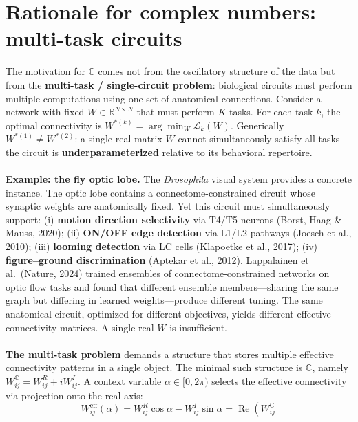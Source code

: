 \documentclass[11pt,a4paper]{article}
\newcommand{\R}{\mathbb{R}}
\newcommand{\C}{\mathbb{C}}
\newcommand{\re}{\operatorname{Re}}
\begin{document}
{%
\section{Rationale for complex numbers: multi-task circuits}
\label{sec:rationale}

The motivation for $\C$ comes not from the oscillatory structure of the data but from the \textbf{multi-task / single-circuit problem}: biological circuits must perform multiple computations using one set of anatomical connections. Consider a network with fixed $W \in \R^{N\times N}$ that must perform $K$ tasks. For each task $k$, the optimal connectivity is $W^{*(k)} = \arg\min_W \mathcal{L}_k(W)$. Generically $W^{*(1)} \neq W^{*(2)}$: a single real matrix $W$ cannot simultaneously satisfy all tasks---the circuit is \textbf{underparameterized} relative to its behavioral repertoire.
\\
\\
\textbf{Example: the fly optic lobe.} The \emph{Drosophila} visual system provides a concrete instance. The optic lobe contains a connectome-constrained circuit whose synaptic weights are anatomically fixed. Yet this circuit must simultaneously support:
(i) \textbf{motion direction selectivity} via T4/T5 neurons (Borst, Haag \& Mauss, 2020);
(ii) \textbf{ON/OFF edge detection} via L1/L2 pathways (Joesch et al., 2010);
(iii) \textbf{looming detection} via LC cells (Klapoetke et al., 2017);
(iv) \textbf{figure--ground discrimination} (Aptekar et al., 2012). Lappalainen et al.\ (Nature, 2024) trained ensembles of connectome-constrained networks on optic flow tasks and found that different ensemble members---sharing the same graph but differing in learned weights---produce different tuning. The same anatomical circuit, optimized for different objectives, yields different effective connectivity matrices. A single real $W$ is insufficient.
\\
\\
\textbf{The multi-task problem} demands a structure that stores multiple effective connectivity patterns in a single object. The minimal such structure is $\C$, namely $W_{ij}^{\C} = W_{ij}^R + iW_{ij}^I$. A context variable $\alpha \in [0, 2\pi)$ selects the effective connectivity via projection onto the real axis:
\begin{equation}
W_{ij}^{\text{eff}}(\alpha) = W_{ij}^R\cos\alpha 
- W_{ij}^I\sin\alpha = \re\!\left(W_{ij}^{\C}\, 

\end{equation}}
\end{document}
